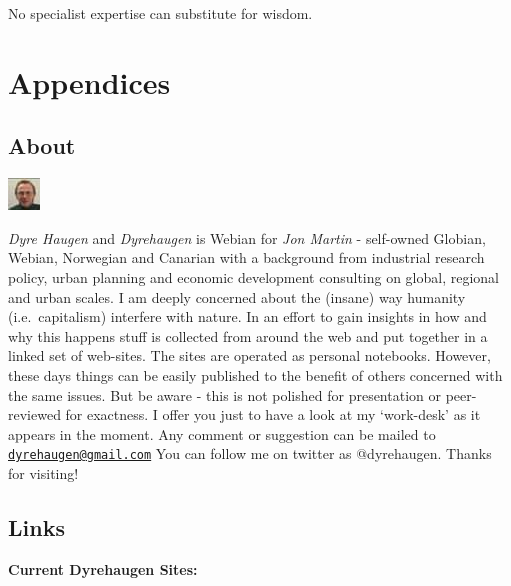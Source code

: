 \documentclass[
]{book}
\begin{document}
No specialist expertise can substitute for wisdom.

\hypertarget{part-appendices}{%
\part{Appendices}\label{part-appendices}}

\hypertarget{appendix-appendices}{%
\appendix}


\hypertarget{about}{%
\chapter{About}\label{about}}

\includegraphics{fig/me.jpg}

\emph{Dyre Haugen} and \emph{Dyrehaugen} is Webian for \emph{Jon Martin} -
self-owned Globian, Webian, Norwegian and Canarian with
a background from industrial research policy, urban planning and
economic development consulting on global, regional and urban scales.
I am deeply concerned about the (insane) way
humanity (i.e.~capitalism) interfere with nature.
In an effort to gain insights in how and why this happens
stuff is collected from around the web and put together
in a linked set of web-sites.
The sites are operated as personal notebooks.
However, these days things can be easily published to the
benefit of others concerned with the same issues.
But be aware - this is not polished for presentation or
peer-reviewed for exactness.
I offer you just to have a look at my `work-desk' as it appears in the moment.
Any comment or suggestion can be mailed to \href{mailto:dyrehaugen@gmail.com}{\nolinkurl{dyrehaugen@gmail.com}}
You can follow me on twitter as @dyrehaugen.
Thanks for visiting!

\hypertarget{links}{%
\chapter{Links}\label{links}}

\textbf{Current Dyrehaugen Sites:}
\end{document}
